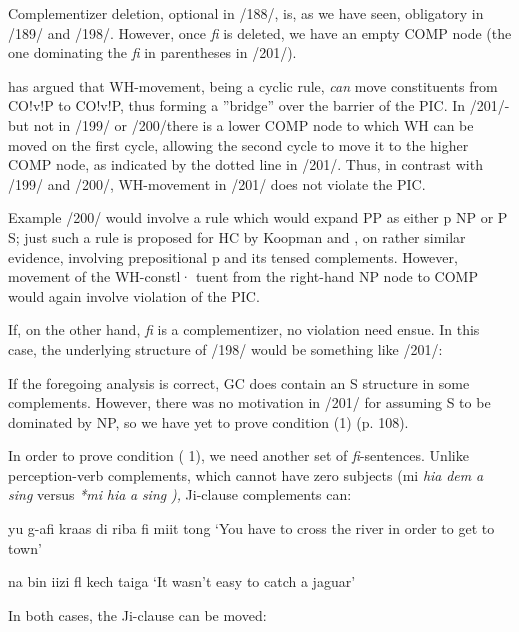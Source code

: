 Complementizer deletion, optional in /188/, is, as we have seen, obliga\-tory in /189/ and /198/. However, once \textit{fi} is deleted, we have an empty COMP node (the one dominating the \textit{fi} in parentheses in /201/).

\citet{Chomsky1977} has argued that WH-movement, being a cyclic rule, \textit{can} move constituents from CO!v!P to CO!v!P, thus forming a ''bridge'' over the barrier of the PIC. In /201/-but not in /199/ or /200/\-there is a lower COMP node to which WH can be moved on the first cycle, allowing the second cycle to move it to the higher COMP node,
as indicated by the dotted line in /201/. Thus, in contrast with /199/ and /200/, WH-movement in /201/ does not violate the PIC.

Example /200/ would involve a rule which would expand PP as either p NP or P S; just such a rule is proposed for HC by Koopman and \citet{Lefebvre1981}, on rather similar evidence, involving prepositional p and its tensed complements. However, movement of the WH-constl· tuent from the right-hand NP node to COMP would again involve
violation of the PIC.

If, on the other hand, \textit{fi} is a complementizer, no violation need
ensue. In this case, the underlying structure of /198/ would be some\-thing like /201/:


If the foregoing analysis is correct, GC does contain an S structure in some complements. However, there was no motivation in /201/ for assuming S to be dominated by NP, so we have yet to prove condi\-tion (1) (p. 108).

In order to prove condition ( 1), we need another set of \textit{fi}-sentences. Unlike perception-verb complements, which cannot have zero subjects (mi \textit{hia} \textit{dem} \textit{a} \textit{sing} versus \textit{*mi} \textit{hia} \textit{a} \textit{sing} \textit{),} Ji{}-clause comple\-ments can:

\ea\label{ex:2:202}
 yu g-afi kraas di riba fi miit tong
\glt `You have to cross the river in order to get to town'
\z





\ea\label{ex:2:203}
 na bin iizi fl kech taiga
\glt `It wasn't easy to catch a jaguar'
\z



In both cases, the Ji-clause can be moved:

